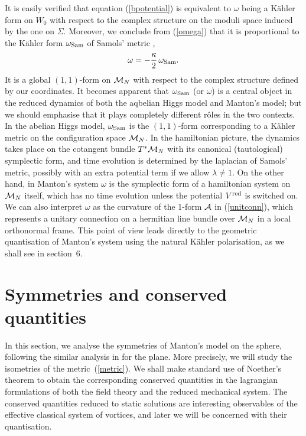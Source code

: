 \documentclass[a4paper,11pt]{article}
\begin{document}
It is easily verified that equation (\ref{bpotential}) is equivalent to  
$\omega$ being a K\"ahler form on $W_{0}$ with respect to the complex 
structure on the moduli space induced by the one on $\Sigma$. 
Moreover, we conclude from 
(\ref{omega}) that it is proportional to the K\"ahler form $\omega_{\rm
Sam}$ of Samols' metric \cite{Sam},
\begin{equation} \label{relwwSam}
\omega=-\frac{\kappa}{2}\,\omega_{\rm Sam}.
\end{equation}
It is a global $(1,1)$-form on ${\cal M}_{N}$ with respect to the
complex structure defined by our coordinates.
It becomes apparent that $\omega_{\rm Sam}$ (or $\omega$)
is a central object in the reduced dynamics of both the
aqbelian Higgs model and Manton's model; but we should emphasise
that it plays completely different r\^oles in the two contexts.
In the abelian Higgs model, $\omega_{\rm Sam}$ is the $(1,1)$-form
corresponding to a K\"ahler metric on the configuration space 
${\cal M}_{N}$. In the hamiltonian picture, the dynamics  
takes place on the cotangent bundle $T^{*}{\cal M}_{N}$ with its 
canonical (tautological) symplectic form, and time evolution is
determined by the laplacian of Samols' metric, possibly with an
extra potential term if we allow $\lambda\ne 1$.
On the other hand, in Manton's system $\omega$ is the
symplectic form of a hamiltonian system on ${\cal M}_{N}$
itself, which has no time evolution unless the potential $V^{\rm red}$
is switched on. We can also interpret $\omega$ as the curvature of the
1-form $\cal A$ in (\ref{unitconn}), which represents a unitary
connection on a hermitian line bundle over ${\cal M}_{N}$ in a local
orthonormal frame. This point of view leads directly to the geometric
quantisation of Manton's system using the natural K\"ahler
polarisation, as we shall see in section~6.



\section {Symmetries and conserved quantities}


In this section, we analyse the symmetries of Manton's model on the 
sphere, following the similar analysis in \cite{MNcl} for the plane. More 
precisely, we will study the isometries of the 
metric~(\ref{metric}).
We shall make standard use of Noether's theorem to obtain the 
corresponding 
conserved quantities in the lagrangian formulations of both the field 
theory and the
reduced mechanical system. The conserved quantities reduced to static
solutions are interesting observables of the effective classical system of
vortices, and later we will be concerned with their quantisation.
\end{document}
